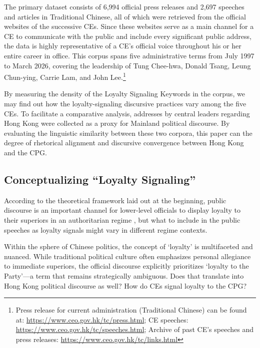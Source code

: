 \documentclass[9pt,a4paper,twocolumn,twoside]{rho-class/rho}
\begin{document}
        The primary dataset consists of 6,994 official press releases and 2,697 speeches and articles in Traditional Chinese, all of which were retrieved from the official websites 
        of the successive CEs. Since these websites serve as a main channel for a CE to communicate with the public and include every significant public address, the data is highly 
        representative of a CE's official voice throughout his or her entire career in office. This corpus spans five administrative terms from July 1997 to March 2026, covering the 
        leadership of Tung Chee-hwa, Donald Tsang, Leung Chun-ying, Carrie Lam, and John Lee.\footnote{Press release for current administration (Traditional Chinese) can be found at: 
        \url{https://www.ceo.gov.hk/tc/press.html}; CE speeches: \url{https://www.ceo.gov.hk/tc/speeches.html}; Archive of past CE's speeches and press releases:
        \url{https://www.ceo.gov.hk/tc/links.html}}
        
        By measuring the density of the Loyalty Signaling Keywords in the corpus, we may find out how the loyalty-signaling discursive practices vary among the five CEs. To facilitate 
        a comparative analysis, addresses by central leaders regarding Hong Kong were collected as a proxy for Mainland political discourse. By evaluating the linguistic similarity 
        between these two corpora, this paper can the degree of rhetorical alignment and discursive convergence between Hong Kong and the CPG. 
               
        
    \subsection{Conceptualizing ``Loyalty Signaling''}

        According to the theoretical framework laid out at the beginning, public discourse is an important channel for lower-level officials to display loyalty to their superiors 
        in an authoritarian regime \parencite{baturo2025personalization}, but what to include in the public speeches as loyalty signals might vary in different regime contexts.

        Within the sphere of Chinese politics, the concept of `loyalty' is multifaceted and nuanced. While traditional political culture often emphasizes personal allegiance to 
        immediate superiors, the official discourse explicitly prioritizes `loyalty to the Party'—a term that remains strategically ambiguous. Does that translate into Hong Kong 
        political discourse as well? How do CEs signal loyalty to the CPG?
\end{document}
